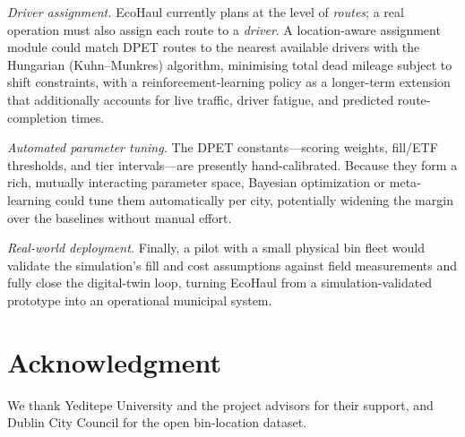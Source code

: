 \documentclass[conference, a4paper]{IEEEtran}
\begin{document}
\textit{Driver assignment.} EcoHaul currently plans at the level of \textit{routes}; a real operation must also assign each route to a \textit{driver}. A location-aware assignment module could match DPET routes to the nearest available drivers with the Hungarian (Kuhn--Munkres) algorithm, minimising total dead mileage subject to shift constraints, with a reinforcement-learning policy as a longer-term extension that additionally accounts for live traffic, driver fatigue, and predicted route-completion times.

\textit{Automated parameter tuning.} The DPET constants---scoring weights, fill/ETF thresholds, and tier intervals---are presently hand-calibrated. Because they form a rich, mutually interacting parameter space, Bayesian optimization or meta-learning could tune them automatically per city, potentially widening the margin over the baselines without manual effort.

\textit{Real-world deployment.} Finally, a pilot with a small physical bin fleet would validate the simulation's fill and cost assumptions against field measurements and fully close the digital-twin loop, turning EcoHaul from a simulation-validated prototype into an operational municipal system.

\section*{Acknowledgment}
We thank Yeditepe University and the project advisors for their support, and Dublin City Council for the open bin-location dataset.
\end{document}
